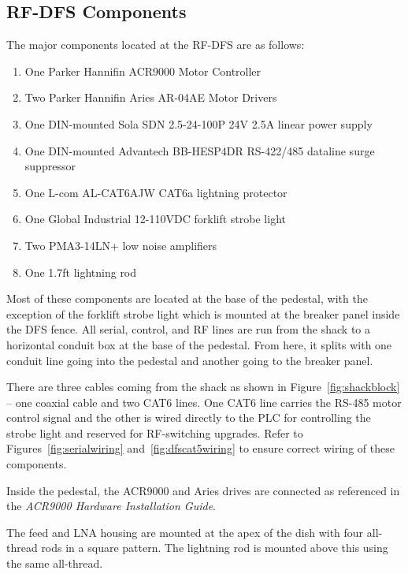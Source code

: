 \documentclass[titlepage]{article}
\begin{document}
\subsection{RF-DFS Components}\label{sec:higdfs}
The major components located at the RF-DFS are as follows:
\begin{enumerate}
  \item One Parker Hannifin ACR9000 Motor Controller
  \item Two Parker Hannifin Aries AR-04AE Motor Drivers
  \item One DIN-mounted Sola SDN 2.5-24-100P 24V 2.5A linear power supply
  \item One DIN-mounted Advantech BB-HESP4DR RS-422/485 dataline surge suppressor
  \item One L-com AL-CAT6AJW CAT6a lightning protector
  \item One Global Industrial 12-110VDC forklift strobe light
  \item Two PMA3-14LN+ low noise amplifiers
  \item One 1.7ft lightning rod
\end{enumerate}
Most of these components are located at the base of the pedestal, with the exception of the forklift strobe light which is mounted at the breaker panel inside the DFS fence. All serial, control, and RF lines are run from the shack to a horizontal conduit box at the base of the pedestal. From here, it splits with one conduit line going into the pedestal and another going to the breaker panel.

There are three cables coming from the shack as shown in Figure~\ref{fig:shackblock} -- one coaxial cable and two CAT6 lines. One CAT6 line carries the RS-485 motor control signal and the other is wired directly to the PLC for controlling the strobe light and reserved for RF-switching upgrades. Refer to Figures~\ref{fig:serialwiring} and~\ref{fig:dfscat5wiring} to ensure correct wiring of these components.

Inside the pedestal, the ACR9000 and Aries drives are connected as referenced in the \textit{ACR9000 Hardware Installation Guide}.

The feed and LNA housing are mounted at the apex of the dish with four all-thread rods in a square pattern. The lightning rod is mounted above this using the same all-thread.
\end{document}
